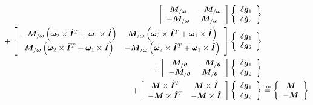 \documentclass[10pt,fleqn,subeqn]{report}
\newcommand{\T}[1]{\bm{#1}}
\newcommand{\equu}{\overset{\text{uu}}{=}}
\begin{document}
\begin{align}
	\sqbr{\matr{cc}{
		\T{M}_{/\T{\omega}} & - \T{M}_{/\T{\omega}} \\
		- \T{M}_{/\T{\omega}} & \T{M}_{/\T{\omega}}
	}} \cubr{\cvvect{
		\delta\dot{\T{g}}_1 \\
		\delta\dot{\T{g}}_2
	}} & \nonumber \\
	+ \sqbr{\matr{cc}{
		- \T{M}_{/\T{\omega}} \plbr{\T{\omega}_2 \times \hat{\T{I}}^T + \T{\omega}_1\times \hat{\T{I}}}
			& \T{M}_{/\T{\omega}} \plbr{\T{\omega}_2 \times \hat{\T{I}}^T + \T{\omega}_1\times \hat{\T{I}}} \\
		\T{M}_{/\T{\omega}} \plbr{\T{\omega}_2\times \hat{\T{I}}^T + \T{\omega}_1\times \hat{\T{I}}}
			& - \T{M}_{/\T{\omega}} \plbr{\T{\omega}_2 \times \hat{\T{I}}^T + \T{\omega}_1\times \hat{\T{I}}}
	}} \cubr{\cvvect{
		\delta\T{g}_1 \\
		\delta\T{g}_2
	}} & \nonumber \\
	+ \sqbr{\matr{cc}{
		\T{M}_{/\T{\theta}} & - \T{M}_{/\T{\theta}} \\
		- \T{M}_{/\T{\theta}} & \T{M}_{/\T{\theta}}
	}} \cubr{\cvvect{
		\delta\T{g}_1 \\
		\delta\T{g}_2
	}} & \nonumber \\
	+ \sqbr{\matr{cc}{
		\T{M} \times \hat{\T{I}}^T & \T{M} \times \hat{\T{I}} \\
		- \T{M} \times \hat{\T{I}}^T & - \T{M} \times \hat{\T{I}}
	}} \cubr{\cvvect{
		\delta\T{g}_1 \\
		\delta\T{g}_2
	}} &\equu \cubr{\cvvect{
		\T{M} \\
		- \T{M}
	}}
\end{align}
\end{document}
